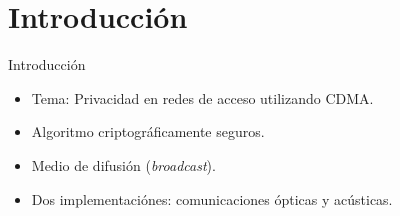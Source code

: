 \documentclass[aspectratio=169]{beamer}
\begin{document}
\section{Introducción}
\begin{frame}{Introducción}


\begin{itemize}
 \item Tema: Privacidad en redes de acceso utilizando CDMA.
 \item Algoritmo criptográficamente seguros.
 \item Medio de difusión (\textit{broadcast}).
 \item Dos implementaciónes: comunicaciones \color{red}ópticas \color{black} y \color{red}acústicas\color{black}.
\end{itemize}


  \begin{figure}[!t]
   \centering
   \qquad
   \qquad
  \label{fig:ImgOjo}
\end{figure}


\end{frame}
\end{document}
